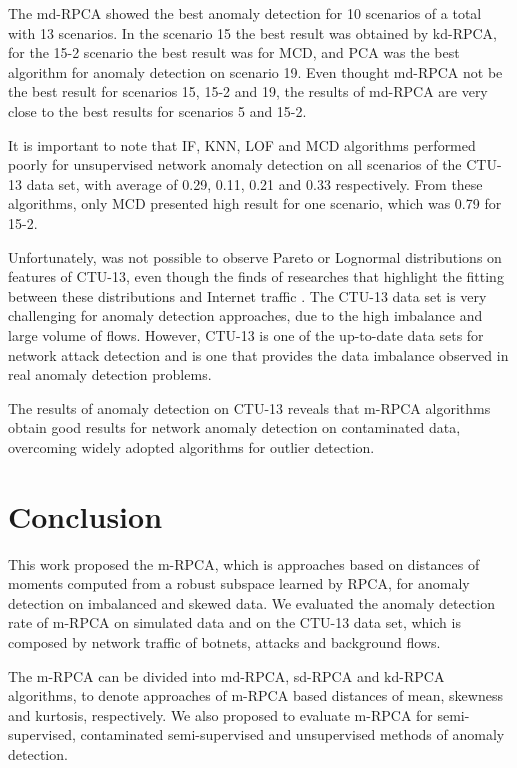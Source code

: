 The md-RPCA showed the best anomaly detection for 10 scenarios of a total with 13 scenarios. In the scenario 15 the best result was obtained by kd-RPCA, for the 15-2 scenario the best result was for MCD, and PCA was the best algorithm for anomaly detection on scenario 19. Even thought md-RPCA not be the best result for scenarios 15, 15-2 and 19, the results of md-RPCA are very close to the best results for scenarios 5 and 15-2.

It is important to note that IF, KNN, LOF and MCD algorithms performed poorly for unsupervised network anomaly detection on all scenarios of the CTU-13 data set, with average of 0.29, 0.11, 0.21 and 0.33 respectively. From these algorithms, only MCD presented high result for one scenario, which was 0.79 for 15-2.

Unfortunately, was not possible to observe Pareto or Lognormal distributions on features of CTU-13, even though the finds of researches that highlight the fitting between these distributions and Internet traffic \cite{benson2010network, leon2017probability}. The CTU-13 data set is very challenging for anomaly detection approaches, due to the high imbalance and large volume of flows. However, CTU-13 is one of the up-to-date data sets for network attack detection and is one that provides the data imbalance observed in real anomaly detection problems.

The results of anomaly detection on CTU-13 reveals that m-RPCA algorithms obtain good results for network anomaly detection on contaminated data, overcoming widely adopted algorithms for outlier detection. 


\section{Conclusion}
\label{sec:6_conclusion}

This work proposed the m-RPCA, which is approaches based on distances of moments computed from a robust subspace learned by RPCA, for anomaly detection on imbalanced and skewed data. We evaluated the anomaly detection rate of m-RPCA on simulated data and on the CTU-13 data set, which is composed by network traffic of botnets, attacks and background flows.

The m-RPCA can be divided into md-RPCA, sd-RPCA and kd-RPCA algorithms, to denote approaches of m-RPCA based distances of mean, skewness and kurtosis, respectively. We also proposed to evaluate m-RPCA for semi-supervised, contaminated semi-supervised and unsupervised methods of anomaly detection.

